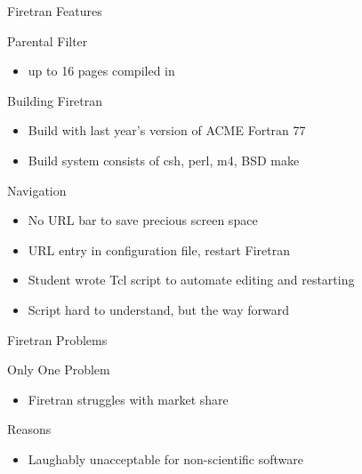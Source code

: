 \begin{frame}[fragile]{Firetran Features}

\begin{block}{Parental Filter}
 \begin{itemize}
  \item up to 16 pages compiled in
 \end{itemize}
\end{block}


\begin{block}{Building Firetran}
 \begin{itemize}
  \item Build with last year's version of ACME Fortran 77
  \item Build system consists of csh, perl, m4, BSD make
 \end{itemize}
\end{block}

\begin{block}{Navigation}
 \begin{itemize}
  \item No URL bar to save precious screen space
  \item URL entry in configuration file, restart Firetran
  \item Student wrote Tcl script to automate editing and restarting
  \item Script hard to understand, but the way forward
 \end{itemize}
\end{block}

\end{frame}



\begin{frame}[fragile]{Firetran Problems}

\begin{block}{Only One Problem}
 \begin{itemize}
  \item Firetran struggles with market share
 \end{itemize}
\end{block}

\begin{block}{Reasons}
 \begin{itemize}
  \item Laughably unacceptable for non-scientific software
 \end{itemize}
\end{block}

\end{frame}

